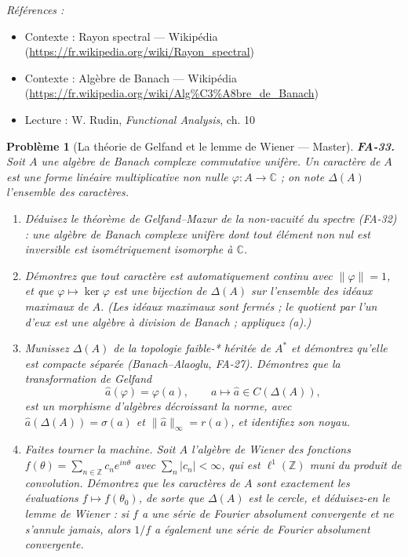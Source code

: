 \documentclass[11pt]{article}
\newtheorem{problem}{Problème}
\newenvironment{refs}{\par\small\noindent\emph{Références :}\begin{itemize}\setlength\itemsep{0pt}}{\end{itemize}\normalsize}
\begin{document}
\begin{refs}
\item Contexte : Rayon spectral --- Wikipédia (\url{https://fr.wikipedia.org/wiki/Rayon_spectral})
\item Contexte : Algèbre de Banach --- Wikipédia (\url{https://fr.wikipedia.org/wiki/Alg%C3%A8bre_de_Banach})
\item Lecture : W. Rudin, \textit{Functional Analysis}, ch. 10
\end{refs}

\bigskip

\begin{problem}[{La théorie de Gelfand et le lemme de Wiener --- Master}]
\textbf{FA-33.} Soit $ A $ une algèbre de Banach complexe commutative unifère. Un
\textit{caractère} de $ A $ est une forme linéaire multiplicative non nulle
$ \varphi : A \to \mathbb{C} $ ; on note $ \Delta(A) $ l'ensemble des caractères.
\begin{enumerate}
\item[(a)] Déduisez le théorème de Gelfand--Mazur de la non-vacuité du spectre (FA-32) : une algèbre de Banach
complexe unifère dont tout élément non nul est inversible est isométriquement isomorphe à
$ \mathbb{C} $.
\item[(b)] Démontrez que tout caractère est automatiquement continu avec $ \|\varphi\| = 1 $, et que
$ \varphi \mapsto \ker\varphi $ est une bijection de $ \Delta(A) $ sur l'ensemble des idéaux
maximaux de $ A $. (Les idéaux maximaux sont fermés ; le quotient par l'un d'eux est une algèbre à
division de Banach ; appliquez (a).)
\item[(c)] Munissez $ \Delta(A) $ de la topologie faible-* héritée de $ A^{*} $ et démontrez qu'elle est
compacte séparée (Banach--Alaoglu, FA-27). Démontrez que la \textit{transformation de Gelfand}
\[ \hat{a}(\varphi) = \varphi(a), \qquad a \mapsto \hat{a} \in C(\Delta(A)), \]
est un morphisme d'algèbres décroissant la norme, avec $ \hat{a}(\Delta(A)) = \sigma(a) $ et
$ \|\hat{a}\|_\infty = r(a) $, et identifiez son noyau.
\item[(d)] Faites tourner la machine. Soit $ A $ l'algèbre de Wiener des fonctions
$ f(\theta) = \sum_{n \in \mathbb{Z}} c_n e^{in\theta} $ avec $ \sum_n |c_n| < \infty $, qui est
$ \ell^1(\mathbb{Z}) $ muni du produit de convolution. Démontrez que les caractères de $ A $ sont
exactement les évaluations $ f \mapsto f(\theta_0) $, de sorte que $ \Delta(A) $ est le cercle, et
déduisez-en le lemme de Wiener : si $ f $ a une série de Fourier absolument convergente et ne
s'annule jamais, alors $ 1/f $ a également une série de Fourier absolument convergente.
\end{enumerate}

\end{problem}
\end{document}
